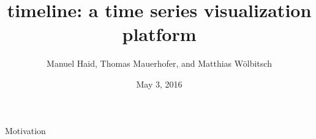 \documentclass{beamer}
\title{timeline: a time series visualization platform}
\date{May 3, 2016}
\author{Manuel Haid, Thomas Mauerhofer, and Matthias Wölbitsch}
\begin{document}
  \maketitle
  
  
  \begin{frame}{Motivation}   
  \end{frame}
  
  
  
  
\end{document}
